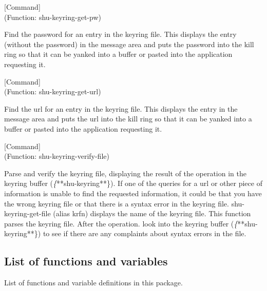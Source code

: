 \vspace{1em}
\noindent
{}
\usebox{\funcname}
 \hfill [Command]\\%
 (Function: shu-keyring-get-pw)

\begin{doc-string}
Find the password for an entry in the keyring file.  This displays the entry
(without the password) in the message area and puts the password into the kill
ring so that it can be yanked into a buffer or pasted into the application
requesting it.
\end{doc-string}

\vspace{1em}
\noindent
{}
\usebox{\funcname}
 \hfill [Command]\\%
 (Function: shu-keyring-get-url)

\begin{doc-string}
Find the url for an entry in the keyring file.  This displays the entry in
the message area and puts the url into the kill ring so that it can be yanked
into a buffer or pasted into the application requesting it.
\end{doc-string}

\vspace{1em}
\noindent
{}
\usebox{\funcname}
 \hfill [Command]\\%
 (Function: shu-keyring-verify-file)

\begin{doc-string}
Parse and verify the keyring file, displaying the result of the operation in the
keyring buffer (\emph\{**shu-keyring**\}).  If one of the queries for a url or other
piece of information is unable to find the requested information, it could be
that you have the wrong keyring file or that there is a syntax error in the
keyring file.  shu-keyring-get-file (alias krfn) displays the name of the
keyring file.  This function parses the keyring file.  After the operation. look
into the keyring buffer (\emph\{**shu-keyring**\}) to see if there are any complaints
about syntax errors in the file.
\end{doc-string}

\subsection{List of functions and variables}

List of functions and variable definitions in this package.



